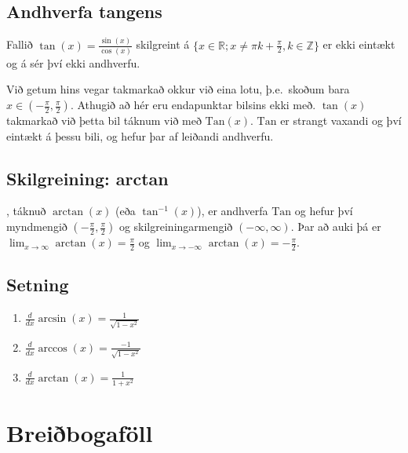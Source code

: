 \documentclass[a4paper,10pt,icelandic]{sphinxmanual}
\begin{document}
\subsection{Andhverfa tangens}
\label{\detokenize{kafli04:andhverfa-tangens}}
Fallið \(\tan(x) = \frac{\sin(x)}{\cos(x)}\) skilgreint á
\(\{x \in {{\mathbb  R}}; x \neq \pi k + \frac \pi 2, k \in {{\mathbb Z}}\}\)
er ekki eintækt og á sér því ekki andhverfu.

Við getum hins vegar takmarkað okkur við eina lotu, þ.e. skoðum bara
\(x\in (-\frac \pi 2, \frac \pi 2)\). Athugið að hér eru endapunktar
bilsins ekki með. \(\tan(x)\) takmarkað við þetta bil táknum við með
\({{\text{Tan}}}(x)\). \({{\text{Tan}}}\) er strangt vaxandi og
því eintækt á þessu bili, og hefur þar af leiðandi andhverfu.


\subsection{Skilgreining: arctan}
\label{\detokenize{kafli04:skilgreining-arctan}}
, táknuð \(\arctan(x)\) (eða
\(\tan^{-1}(x)\)), er andhverfa \({{\text{Tan}}}\) og hefur því
myndmengið \((-\frac \pi 2,
\frac \pi 2)\) og skilgreiningarmengið \((-\infty,\infty)\). Þar að
auki þá er
\(\lim_{x\to \infty} \arctan(x) = \frac \pi 2\) og
\(\lim_{x\to -\infty} \arctan(x) = -\frac \pi 2\).



\subsection{Setning}
\label{\detokenize{kafli04:id7}}\begin{enumerate}
\item {} 
\(\frac d{dx} \arcsin(x) = \frac 1{\sqrt{1-x^2}}\)

\item {} 
\(\frac d{dx} \arccos(x) = \frac {-1}{\sqrt{1-x^2}}\)

\item {} 
\(\frac d{dx} \arctan(x) = \frac 1{1+x^2}\)

\end{enumerate}


\section{Breiðbogaföll}
\label{\detokenize{kafli04:breibogafoll}}
\end{document}
